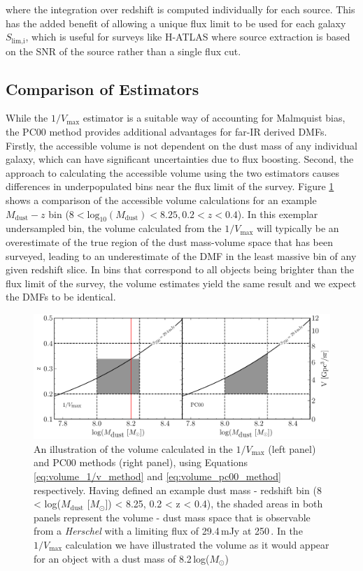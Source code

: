 \noindent where the integration over redshift is computed individually for each source. This has the added benefit of allowing a unique flux limit to be used for each galaxy $S_{\textrm{lim,i}}$, which is useful for surveys like H-ATLAS where source extraction is based on the SNR of the source rather than a single flux cut.

\subsection{Comparison of Estimators}

While the $1/V_{\textrm{max}}$ estimator is a suitable way of accounting for Malmquist bias, the PC00 method provides additional advantages for far-IR derived DMFs. Firstly, the accessible volume is not dependent on the dust mass of any individual galaxy, which can have significant uncertainties due to flux boosting. Second, the approach to calculating the accessible volume using the two estimators causes differences in underpopulated bins near the flux limit of the survey. Figure \ref{fig:volume_comparison} shows a comparison of the accessible volume calculations for an example $M_{\textrm{dust}} - z$ bin ($8 < \textrm{log}_{10}(M_\textrm{dust}) < 8.25, 0.2 < z < 0.4$). In this exemplar undersampled bin, the volume calculated from the $1/V_{\textrm{max}}$ will typically be an overestimate of the true region of the dust mass-volume space that has been surveyed, leading to an underestimate of the DMF in the least massive bin of any given redshift slice. In bins that correspond to all objects being brighter than the flux limit of the survey, the volume estimates yield the same result and we expect the DMFs to be identical.

\begin{figure}
	\centering
	\includegraphics[width=\columnwidth]{Figures/volume_comparison.pdf}
	\caption{An illustration of the volume calculated in the $1/V_{\textrm{max}}$ (left panel) and PC00 methods (right panel), using Equations \ref{eq:volume_1/v_method} and \ref{eq:volume_pc00_method} respectively. Having defined an example dust mass - redshift bin (8 < log($M_{\textrm{dust}}$ [$M_{\odot}$]) < 8.25, 0.2 < z < 0.4), the shaded areas in both panels represent the volume - dust mass space that is observable from a \textit{Herschel} with a limiting flux of 29.4\,mJy at 250\,\micron. In the $1/V_{\textrm{max}}$ calculation we have illustrated the volume as it would appear for an object with a dust mass of 8.2\,log($M_{\odot}$)}
	\label{fig:volume_comparison}
\end{figure}

